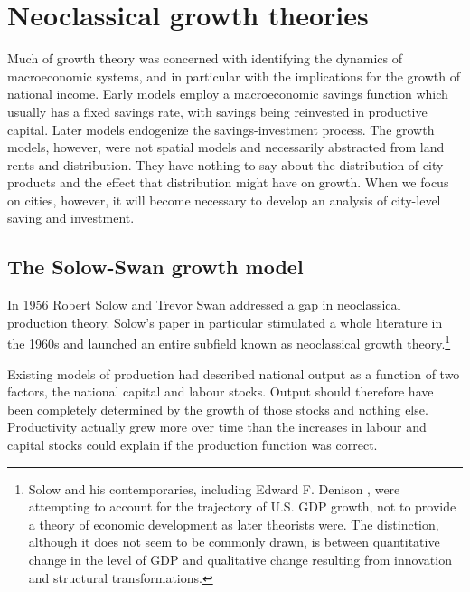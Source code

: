 \section{Neoclassical growth theories}  \label{section-growth}
Much of growth theory was concerned with identifying the dynamics of macroeconomic systems,  and in particular with the implications for the growth of national income. Early models \cite{keynesGeneralTheoryEmployment1937, harrodEssayDynamicTheory1939, domarCapitalExpansionRate1946}  employ a macroeconomic savings function which usually has a fixed savings rate, with savings being reinvested in productive capital. Later models endogenize the savings-investment process. The growth models, however, were not spatial models and necessarily abstracted from land rents and distribution. They have nothing to say about the distribution of city products and the effect that distribution might have on growth. When we focus on cities, however, it will become necessary to develop an analysis of city-level saving and investment. 


\subsection{The Solow-Swan growth model}
In 1956 Robert Solow \cite{solowContributionTheoryEconomic1956} and Trevor Swan \cite{swanEconomicGrowthCapital1956}
addressed a gap in  neoclassical production theory.  Solow's paper in particular stimulated a whole literature in the 1960s and launched an entire subfield known as  neoclassical growth theory.\footnote{Solow and his contemporaries, including Edward F. Denison \cite{denisonSourcesEconomicGrowth1962}, were attempting to account for the trajectory
of U.S. GDP growth, not to provide a theory of economic development as later theorists were. The distinction, although it does not seem to be commonly drawn, is between quantitative change in the level of GDP and qualitative change resulting from innovation and structural transformations.} %


Existing models of production had described national output as a function of two  factors, the national capital and labour stocks. Output should therefore have been completely determined by the growth of those stocks and nothing else. Productivity actually grew more over time than the increases in labour and capital stocks could explain if the production function was correct.

